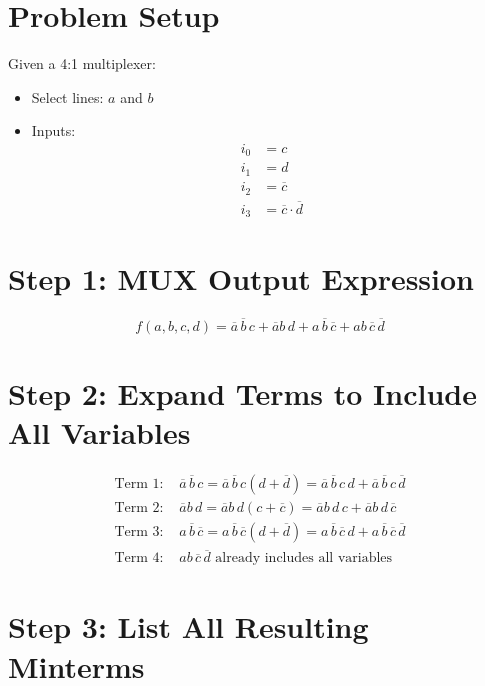 \documentclass[12pt]{article}
\begin{document}
\section*{Problem Setup}

Given a 4:1 multiplexer:
\begin{itemize}
    \item Select lines: $a$ and $b$
    \item Inputs:
    \[
    \begin{aligned}
    i_0 &= c \\
    i_1 &= d \\
    i_2 &= \overline{c} \\
    i_3 &= \overline{c} \cdot \overline{d}
    \end{aligned}
    \]
\end{itemize}

\section*{Step 1: MUX Output Expression}

\[
f(a,b,c,d) = \overline{a}\,\overline{b}\,c + \overline{a}b\,d + a\,\overline{b}\,\overline{c} + ab\,\overline{c}\,\overline{d}
\]

\section*{Step 2: Expand Terms to Include All Variables}

\begin{align*}
\text{Term 1: } & \overline{a}\,\overline{b}\,c = \overline{a}\,\overline{b}\,c(d + \overline{d}) = \overline{a}\,\overline{b}\,c\,d + \overline{a}\,\overline{b}\,c\,\overline{d} \\
\text{Term 2: } & \overline{a}b\,d = \overline{a}b\,d(c + \overline{c}) = \overline{a}b\,d\,c + \overline{a}b\,d\,\overline{c} \\
\text{Term 3: } & a\,\overline{b}\,\overline{c} = a\,\overline{b}\,\overline{c}(d + \overline{d}) = a\,\overline{b}\,\overline{c}\,d + a\,\overline{b}\,\overline{c}\,\overline{d} \\
\text{Term 4: } & ab\,\overline{c}\,\overline{d} \text{ already includes all variables}
\end{align*}

\section*{Step 3: List All Resulting Minterms}
\end{document}
